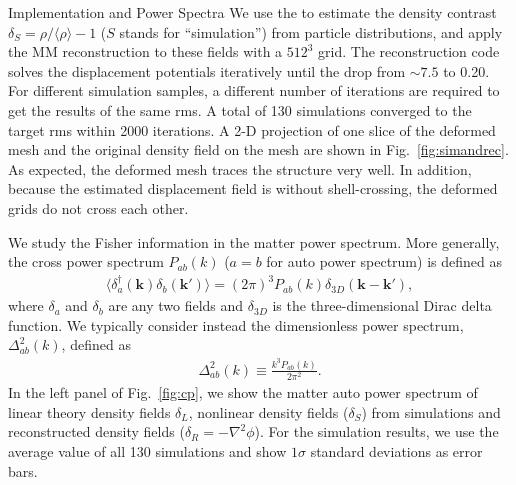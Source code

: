 \begin{section}{Implementation and Power Spectra}
 We use the  to estimate the density contrast
 $\delta_S=\rho/\langle\rho\rangle-1$ ($S$ stands for ``simulation'') from particle distributions, and apply the
 MM reconstruction to these fields with a $512^3$ grid.
 The reconstruction code solves the displacement potentials iteratively
 until the  drop from $\sim 7.5$
 to 0.20. For different simulation samples, a different number of
 iterations are required to get the results of the same rms. A total of
 130 simulations converged to the target rms within 2000 iterations.  A 2-D projection
 of one slice of the deformed mesh and the original density field on
 the mesh are shown in Fig.~\ref{fig:simandrec}. 
 As expected, the deformed mesh traces the structure very well. In addition,
 because the estimated displacement field is without shell-crossing,
 the deformed grids do not cross each other.
 
 We study the Fisher information in the matter power
 spectrum. More generally,
 the cross power spectrum $P_{ab}(k)$ ($a=b$ for auto power spectrum) is defined as
 \begin{align}
   \langle \delta_a^\dagger(\bm{k})\delta_b(\bm{k'}) \rangle =
   (2\pi)^3 P_{ab}(k) \delta_{3D}(\bm{k}-\bm{k'}),
 \end{align}
 where $\delta_{a}$ and $\delta_{b}$ are any two fields and
 $\delta_{3D}$ is the three-dimensional Dirac delta function. We typically consider instead
 the dimensionless power spectrum, $\Delta_{ab}^2(k)$, defined as
 \begin{align}
   \Delta_{ab}^2(k) \equiv \frac{k^3 P_{ab}(k)}{2\pi ^2}.
 \end{align}
 In the left panel of Fig.~\ref{fig:cp}, we show the matter auto power
 spectrum of linear theory density fields $\delta_L$, nonlinear density
 fields ($\delta_S$) from simulations and reconstructed density fields
 ($\delta_R=-\nabla^2\phi$).  For the simulation
 results, we use the average value of all 130 simulations and show
 $1\sigma$ standard deviations as error bars.  


\end{section}
